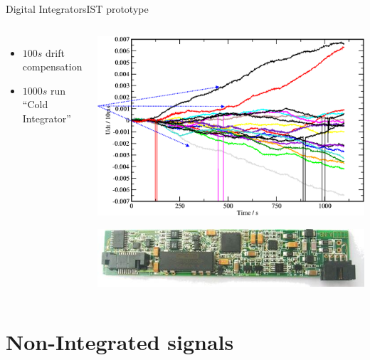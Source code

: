 \documentclass{beamer}
\begin{document}
\begin{frame}{Digital Integrators}{IST prototype}
\begin{columns}
	\begin{itemize}
		\item $100 s$ drift  compensation
		\item $1000 s$ run “Cold Integrator”
	\end{itemize}
	\begin{center}
		\includegraphics[height = 3 cm]{w7xDrift.png}

		\includegraphics[height = 1 cm]{AtcaAdc.jpg} 
	\end{center}
\end{columns}
\end{frame}



\section{Non-Integrated signals}

\end{document}
